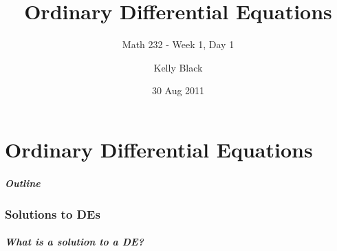 

\part{Ordinary Differential Equations}

\title{Ordinary Differential Equations}
\subtitle{Math 232 - Week 1, Day 1}

\author{Kelly Black}
\date{30 Aug 2011}

\begin{frame}
  \titlepage
\end{frame}

\begin{frame}
  \frametitle{Outline}
\end{frame}


\section{Solutions to DEs}


\begin{frame}
  \frametitle{What is a solution to a DE?}


\end{frame}


\begin{frame}
  \frametitle{}


\end{frame}


\begin{frame}
  \frametitle{}


\end{frame}


\begin{frame}
  \frametitle{}


\end{frame}


\begin{frame}
  \frametitle{}


\end{frame}


\begin{frame}
  \frametitle{}


\end{frame}


\begin{frame}
  \frametitle{}


\end{frame}


\begin{frame}
  \frametitle{}


\end{frame}


\begin{frame}
  \frametitle{}


\end{frame}



